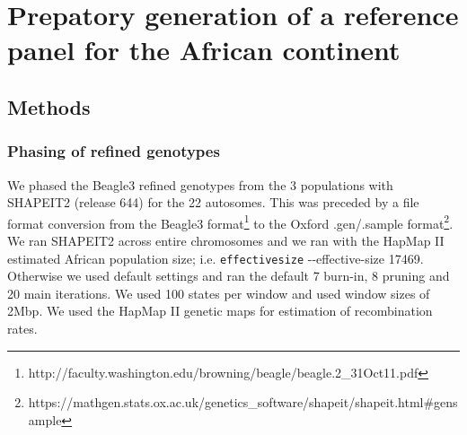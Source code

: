 \section{Prepatory generation of a reference panel for the African continent}
\label{chap:reference_panel}

\subsection{Methods}

\subsubsection{Phasing of refined genotypes}
We phased the Beagle3 refined genotypes from the 3 populations with SHAPEIT2\cite{Delaneau2012} (release 644) for the 22 autosomes. This was preceded by a file format conversion from the Beagle3 format\footnote{http://faculty.washington.edu/browning/beagle/beagle.2\_31Oct11.pdf} to the Oxford .gen/.sample format\footnote{https://mathgen.stats.ox.ac.uk/genetics\_software/shapeit/shapeit.html\#gensample}. We ran SHAPEIT2 across entire chromosomes and we ran with the HapMap II\cite{hapmap2007} estimated African population size\cite{Wright01031931}\cite{Wright1938}; i.e. \texttt{\-\-effective\-size} -{}-effective-size 17469. Otherwise we used default settings and ran the default 7 burn-in, 8 pruning and 20 main iterations. We used 100 states per window and used window sizes of 2\gls{Mbp}. We used the HapMap II genetic maps for estimation of recombination rates.

